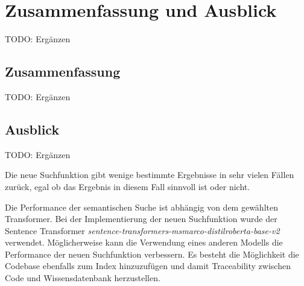 \chapter{Zusammenfassung und Ausblick}
TODO: Ergänzen

\section{Zusammenfassung}
TODO: Ergänzen

\section{Ausblick}
TODO: Ergänzen

Die neue Suchfunktion gibt wenige bestimmte Ergebnisse in sehr vielen Fällen zurück, egal ob das Ergebnis in diesem Fall sinnvoll ist oder nicht.

Die Performance der semantischen Suche ist abhängig von dem gewählten Transformer.
Bei der Implementierung der neuen Suchfunktion wurde der Sentence Transformer \textit{sentence-transformers-msmarco-distilroberta-base-v2} verwendet.
Möglicherweise kann die Verwendung eines anderen Modells die Performance der neuen Suchfunktion verbessern.
Es besteht die Möglichkeit die Codebase ebenfalls zum Index hinzuzufügen und damit Traceability zwischen Code und Wissensdatenbank herzustellen.


